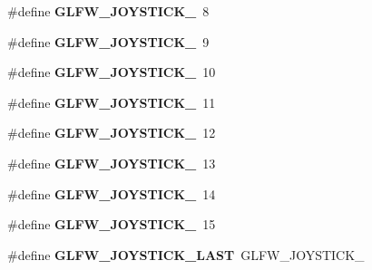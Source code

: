 \begin{DoxyCompactItemize}
\item 
\hypertarget{group__joysticks_ga87689d47df0ba6f9f5fcbbcaf7b3cecf}{\#define {\bfseries \-G\-L\-F\-W\-\_\-\-J\-O\-Y\-S\-T\-I\-C\-K\-\_}~8}\label{group__joysticks_ga87689d47df0ba6f9f5fcbbcaf7b3cecf}

\item 
\hypertarget{group__joysticks_gaef55389ee605d6dfc31aef6fe98c54ec}{\#define {\bfseries \-G\-L\-F\-W\-\_\-\-J\-O\-Y\-S\-T\-I\-C\-K\-\_}~9}\label{group__joysticks_gaef55389ee605d6dfc31aef6fe98c54ec}

\item 
\hypertarget{group__joysticks_gae7d26e3df447c2c14a569fcc18516af4}{\#define {\bfseries \-G\-L\-F\-W\-\_\-\-J\-O\-Y\-S\-T\-I\-C\-K\-\_}~10}\label{group__joysticks_gae7d26e3df447c2c14a569fcc18516af4}

\item 
\hypertarget{group__joysticks_gab91bbf5b7ca6be8d3ac5c4d89ff48ac7}{\#define {\bfseries \-G\-L\-F\-W\-\_\-\-J\-O\-Y\-S\-T\-I\-C\-K\-\_}~11}\label{group__joysticks_gab91bbf5b7ca6be8d3ac5c4d89ff48ac7}

\item 
\hypertarget{group__joysticks_ga5c84fb4e49bf661d7d7c78eb4018c508}{\#define {\bfseries \-G\-L\-F\-W\-\_\-\-J\-O\-Y\-S\-T\-I\-C\-K\-\_}~12}\label{group__joysticks_ga5c84fb4e49bf661d7d7c78eb4018c508}

\item 
\hypertarget{group__joysticks_ga89540873278ae5a42b3e70d64164dc74}{\#define {\bfseries \-G\-L\-F\-W\-\_\-\-J\-O\-Y\-S\-T\-I\-C\-K\-\_}~13}\label{group__joysticks_ga89540873278ae5a42b3e70d64164dc74}

\item 
\hypertarget{group__joysticks_ga7b02ab70daf7a78bcc942d5d4cc1dcf9}{\#define {\bfseries \-G\-L\-F\-W\-\_\-\-J\-O\-Y\-S\-T\-I\-C\-K\-\_}~14}\label{group__joysticks_ga7b02ab70daf7a78bcc942d5d4cc1dcf9}

\item 
\hypertarget{group__joysticks_ga453edeeabf350827646b6857df4f80ce}{\#define {\bfseries \-G\-L\-F\-W\-\_\-\-J\-O\-Y\-S\-T\-I\-C\-K\-\_}~15}\label{group__joysticks_ga453edeeabf350827646b6857df4f80ce}

\item 
\hypertarget{group__joysticks_ga9ca13ebf24c331dd98df17d84a4b72c9}{\#define {\bfseries \-G\-L\-F\-W\-\_\-\-J\-O\-Y\-S\-T\-I\-C\-K\-\_\-\-L\-A\-S\-T}~\-G\-L\-F\-W\-\_\-\-J\-O\-Y\-S\-T\-I\-C\-K\-\_}\label{group__joysticks_ga9ca13ebf24c331dd98df17d84a4b72c9}

\end{DoxyCompactItemize}
